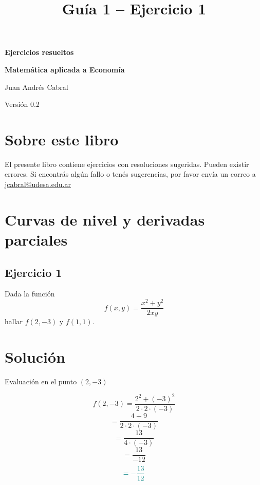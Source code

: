 \documentclass{article}
\newcommand{\version}{0.2}
\begin{document}
\begin{titlepage}
    \centering
    \vspace*{2cm}
    {\Huge\bfseries\color{teal} Ejercicios resueltos\par}
    \vspace{0.5cm}
    {\Large\bfseries Matemática aplicada a Economía\par}
    \vspace{2cm}
    {\large Juan Andrés Cabral\par}
    \vfill
    {\normalsize Versión \version\par}
    \thispagestyle{empty}
\end{titlepage}

\section*{Sobre este libro}


El presente libro contiene ejercicios con resoluciones sugeridas. Pueden existir errores.  
Si encontrás algún fallo o tenés sugerencias, por favor envía un correo a \url{jcabral@udesa.edu.ar}
\newpage


\renewcommand{\contentsname}{Índice}
\tableofcontents
\newpage

\title{Guía 1 – Ejercicio 1}
\author{}
\date{}





\section{Curvas de nivel y derivadas parciales}
\subsection{Ejercicio 1}
Dada la función 
\[
f(x, y) = \frac{x^2 + y^2}{2xy}
\]
hallar \(f(2, -3)\) y \(f(1, 1)\).

\newpage

\section*{Solución}

Evaluación en el punto $(2, -3)$

\[
f(2, -3) = \frac{2^2 + (-3)^2}{2 \cdot 2 \cdot (-3)}
\]
\[
= \frac{4 + 9}{2 \cdot 2 \cdot (-3)}
\]
\[
= \frac{13}{4 \cdot (-3)}
\]
\[
= \frac{13}{-12}
\]
\[
\color{teal}= -\frac{13}{12}
\]
\end{document}
